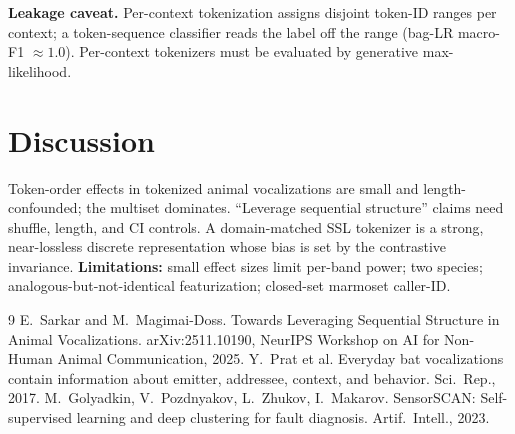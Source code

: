 \documentclass[10pt,twocolumn]{article}
\begin{document}
\textbf{Leakage caveat.} Per-context tokenization assigns disjoint token-ID ranges per
context; a token-sequence classifier reads the label off the range (bag-LR macro-F1
$\approx 1.0$). Per-context tokenizers must be evaluated by generative max-likelihood.

\section{Discussion}
Token-order effects in tokenized animal vocalizations are small and length-confounded;
the multiset dominates. ``Leverage sequential structure'' claims need shuffle, length,
and CI controls. A domain-matched SSL tokenizer is a strong, near-lossless discrete
representation whose bias is set by the contrastive invariance. \textbf{Limitations:}
small effect sizes limit per-band power; two species; analogous-but-not-identical
featurization; closed-set marmoset caller-ID.

\begin{thebibliography}{9}
\small
{} E.~Sarkar and M.~Magimai-Doss. Towards Leveraging Sequential
Structure in Animal Vocalizations. arXiv:2511.10190, NeurIPS Workshop on AI for
Non-Human Animal Communication, 2025.
 Y.~Prat et al. Everyday bat vocalizations contain information about
emitter, addressee, context, and behavior. Sci.\ Rep., 2017.
 M.~Golyadkin, V.~Pozdnyakov, L.~Zhukov, I.~Makarov. SensorSCAN:
Self-supervised learning and deep clustering for fault diagnosis. Artif.\ Intell., 2023.
\end{thebibliography}
\end{document}
